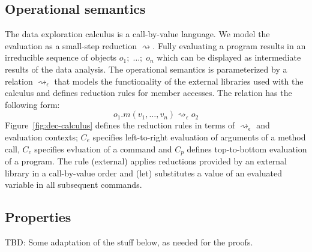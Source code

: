 \documentclass[acmsmall,anonymous,fleqn]{acmart}\settopmatter{printfolios=false,printccs=false,printacmref=false}
\theoremstyle{plain}
\theoremstyle{definition}
\begin{document}
\subsection{Operational semantics}
The data exploration calculus is a call-by-value language. We model the evaluation as a small-step
reduction $\rightsquigarrow$. Fully evaluating a program results in an irreducible sequence of
objects $o_1;\; \ldots;\; o_n$ which can be displayed as intermediate results of the data analysis. The
operational semantics is parameterized by a relation $\rightsquigarrow_\epsilon$ that models
the functionality of the external libraries used with the calculus and defines reduction rules
for member accesses. The relation has the following form:
%
\begin{equation*}
o_1.m(v_1, \ldots, v_n) \rightsquigarrow_\epsilon o_2
\end{equation*}
%
Figure~\ref{fig:dec-calculus} defines the reduction rules in terms of $\rightsquigarrow_\epsilon$
and evaluation contexts; $C_e$ specifies left-to-right evaluation of arguments of a method call,
$C_c$ specifies evluation of a command and $C_p$ defines top-to-bottom evaluation of a program.
The rule {\small\sffamily (external)} applies reductions provided by an external library in a
call-by-value order and {\small\sffamily (let)} substitutes a value of an evaluated variable in
all subsequent commands.

\subsection{Properties}

TBD: Some adaptation of the stuff below, as needed for the proofs.

\newpage
\end{document}
